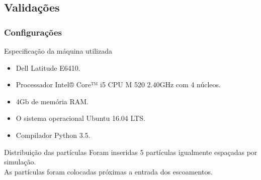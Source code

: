 \documentclass{beamer}
\begin{document}
\subsection{Validações}
\begin{frame}
  \frametitle{Configurações}
  
  \begin{block}{Especificação da máquina utilizada}
    \begin{itemize}
      \item Dell Latitude E6410.
      \item Processador Intel® Core™ i5 CPU M 520 2.40GHz com 4 núcleos.
      \item 4Gb de memória RAM.
      \item O sistema operacional Ubuntu 16.04 LTS.
      \item Compilador Python 3.5.
    \end{itemize}
  \end{block}
  
  \begin{block}{Distribuição das partículas}
    Foram inseridas 5 partículas igualmente espaçadas por simulação.\\
    As partículas foram colocadas próximas a entrada dos escoamentos.
  \end{block}
\end{frame}
\end{document}
